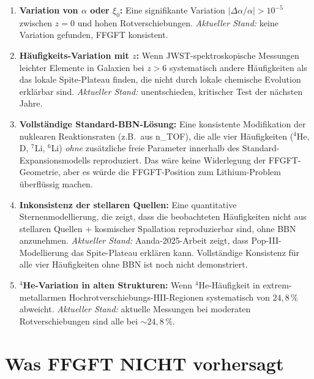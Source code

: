 \begin{enumerate}[leftmargin=2em,itemsep=4pt,topsep=2pt]
  \item \textbf{Variation von $\alpha$ oder $\xi_0$:}
        Eine signifikante Variation $|\Delta\alpha/\alpha| > 10^{-5}$
        zwischen $z = 0$ und hohen Rotverschiebungen.
        \emph{Aktueller Stand:} keine Variation gefunden, FFGFT
        konsistent.

  \item \textbf{Häufigkeits-Variation mit $z$:}
        Wenn JWST-spektroskopische Messungen leichter Elemente in
        Galaxien bei $z > 6$ systematisch andere Häufigkeiten als
        das lokale Spite-Plateau finden, die nicht durch lokale
        chemische Evolution erklärbar sind.
        \emph{Aktueller Stand:} unentschieden, kritischer Test der
        nächsten Jahre.

  \item \textbf{Vollständige Standard-BBN-Lösung:}
        Eine konsistente Modifikation der nuklearen Reaktionsraten
        (z.B.\ aus n\_TOF), die alle vier Häufigkeiten ($^4$He, D,
        $^7$Li, $^6$Li) \emph{ohne} zusätzliche freie Parameter
        innerhalb des Standard-Expansionsmodells reproduziert. Das
        wäre keine Widerlegung der FFGFT-Geometrie, aber es würde
        die FFGFT-Position zum Lithium-Problem überflüssig machen.

  \item \textbf{Inkonsistenz der stellaren Quellen:}
        Eine quantitative Sternenmodellierung, die zeigt, dass die
        beobachteten Häufigkeiten nicht aus stellaren Quellen +
        kosmischer Spallation reproduzierbar sind, ohne BBN
        anzunehmen.
        \emph{Aktueller Stand:} Aanda-2025-Arbeit zeigt, dass
        Pop-III-Modellierung das Spite-Plateau erklären kann.
        Vollständige Konsistenz für alle vier Häufigkeiten ohne
        BBN ist noch nicht demonstriert.

  \item \textbf{$^4$He-Variation in alten Strukturen:}
        Wenn $^4$He-Häufigkeit in extrem-metallarmen
        Hochrotverschiebungs-HII-Regionen systematisch von
        $24{,}8\,\%$ abweicht.
        \emph{Aktueller Stand:} aktuelle Messungen bei moderaten
        Rotverschiebungen sind alle bei $\sim 24{,}8\,\%$.
\end{enumerate}

\section{Was FFGFT NICHT vorhersagt}

